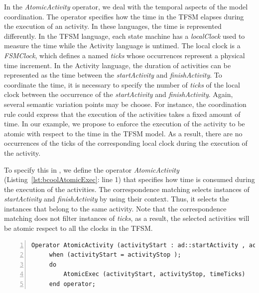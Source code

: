 	 	
In the \emph{AtomicActivity} operator, we deal with the temporal aspects of the model coordination. The operator specifies how the time in the TFSM elapses during the execution of an activity. In these languages, the time is represented differently. In the TFSM language, each state machine has a \emph{localClock} used to measure the time while the Activity language is untimed. The local clock is a \emph{FSMClock}, which defines a \dse named \emph{ticks} whose occurrences represent a physical time increment. In the Activity language, the duration of activities can be represented as the time between the \dse \emph{startActivity} and \dse \emph{finishActivity}. To coordinate the time, it is necessary to specify the number of \emph{ticks} of the local clock between the occurrence of the \dse \emph{startActivity} and \emph{finishActivity}. Again, several semantic variation points may be choose. For instance, the coordination rule could express that the execution of the activities takes a fixed amount of time. In our example, we propose to enforce the execution of the activity to be atomic with respect to the time in the TFSM model. As a result, there are no occurrences of the \dse ticks of the corresponding local clock during the execution of the activity.
	 
To specify this in \bcool, we define the operator \emph{AtomicActivity} (Listing~\ref{lst:bcoolAtomicExec}: line 1) that specifies how time is consumed during the execution of the activities. The correspondence matching selects instances of \dse \emph{startActivity} and \emph{finishActivity} by using their context. Thus, it selects the instances that belong to the same activity. Note that the correspondence matching does not filter instances of \dse \emph{ticks}, as a result, the selected activities will be atomic respect to all the clocks in the TFSM.
	 
	 
	 \begin{lstlisting}[language=bcool,
	 caption={\bcool specification of the \emph{AtomicActivity} operator},
	 label={lst:bcoolAtomicExec}, 
	 basicstyle=\scriptsize\ttfamily, backgroundcolor=\color{LGrey}, numbers=left, xleftmargin=2pt, firstnumber=1]
	 Operator AtomicActivity (activityStart : ad::startActivity , activityStop : ad::finishActivity, timeTicks : tfsm::ticks)
	 when (activityStart = activityStop );
	 do 
		 AtomicExec (activityStart, activityStop, timeTicks)
	 end operator;
	 \end{lstlisting}
	 
